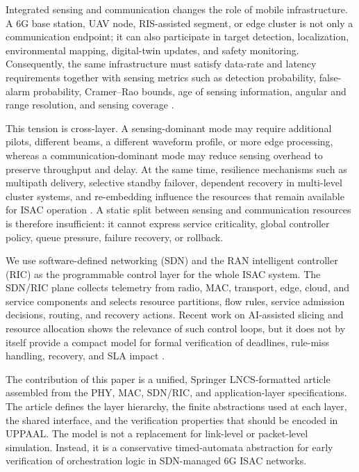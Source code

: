 \documentclass[runningheads]{llncs}
\begin{document}
Integrated sensing and communication changes the role of mobile infrastructure. A 6G base station, UAV node, RIS-assisted segment, or edge cluster is not only a communication endpoint; it can also participate in target detection, localization, environmental mapping, digital-twin updates, and safety monitoring. Consequently, the same infrastructure must satisfy data-rate and latency requirements together with sensing metrics such as detection probability, false-alarm probability, Cramer--Rao bounds, age of sensing information, angular and range resolution, and sensing coverage \cite{qaisar_role_2026,liu_cooperative_2025,ahmed_advancements_2025,luo_integrated_2025}.

This tension is cross-layer. A sensing-dominant mode may require additional pilots, different beams, a different waveform profile, or more edge processing, whereas a communication-dominant mode may reduce sensing overhead to preserve throughput and delay. At the same time, resilience mechanisms such as multipath delivery, selective standby failover, dependent recovery in multi-level cluster systems, and re-embedding influence the resources that remain available for ISAC operation \cite{bogatyrev_redundant_2015,mustafin_selective_2026,bogatyrev_combinatorial-probabilistic_2026}. A static split between sensing and communication resources is therefore insufficient: it cannot express service criticality, global controller policy, queue pressure, failure recovery, or rollback.

We use software-defined networking (SDN) and the RAN intelligent controller (RIC) as the programmable control layer for the whole ISAC system. The SDN/RIC plane collects telemetry from radio, MAC, transport, edge, cloud, and service components and selects resource partitions, flow rules, service admission decisions, routing, and recovery actions. Recent work on AI-assisted slicing and resource allocation shows the relevance of such control loops, but it does not by itself provide a compact model for formal verification of deadlines, rule-miss handling, recovery, and SLA impact \cite{hossain_ai-assisted_2023,radosavljevic_rl-based_2025,aman_ai-driven_2026}.

The contribution of this paper is a unified, Springer LNCS-formatted article assembled from the PHY, MAC, SDN/RIC, and application-layer specifications. The article defines the layer hierarchy, the finite abstractions used at each layer, the shared interface, and the verification properties that should be encoded in UPPAAL. The model is not a replacement for link-level or packet-level simulation. Instead, it is a conservative timed-automata abstraction for early verification of orchestration logic in SDN-managed 6G ISAC networks.
\end{document}
